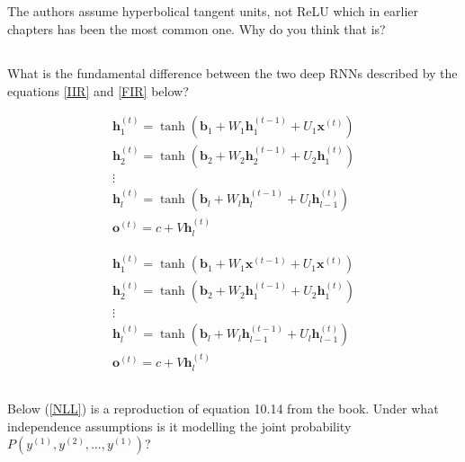 \documentclass[a4paper]{report}
\renewcommand{\vec}[1]{{\boldsymbol{#1}}}
\newcommand{\tvec}[2]{{\vec{#1}^{(#2)}}}
\newcommand{\stvec}[3]{{\vec{#1}_{#2}^{(#3)}}}
\begin{document}
\subsection{} The authors assume hyperbolical tangent units, not ReLU which in earlier chapters has been the most common one. Why do you think that is?

\subsection{} What is the fundamental difference between the two deep RNNs described by the equations \ref{IIR} and \ref{FIR} below?

  \begin{equation}
    \label{IIR}
\begin{gathered}
  \stvec{h}{1}{t} = \tanh(\vec{b}_1 + W_1 \stvec{h}{1}{t-1} + U_1\tvec{x}{t})\\
  \stvec{h}{2}{t} = \tanh(\vec{b}_2 + W_2 \stvec{h}{2}{t-1} + U_2\stvec{h}{1}{t})\\
  \vdots \\
    \stvec{h}{l}{t} = \tanh(\vec{b}_l + W_l \stvec{h}{l}{t-1} + U_l\stvec{h}{l-1}{t})\\
    \tvec{o}{t} = c + V\stvec{h}{l}{t}
\end{gathered}
\end{equation}

  \vspace{10mm}

  \begin{equation}
    \label{FIR}
\begin{gathered}
  \stvec{h}{1}{t} = \tanh(\vec{b}_1 + W_1 \tvec{x}{t-1} + U_1\tvec{x}{t})\\
  \stvec{h}{2}{t} = \tanh(\vec{b}_2 + W_2 \stvec{h}{1}{t-1} + U_2\stvec{h}{1}{t})\\
  \vdots \\
    \stvec{h}{l}{t} = \tanh(\vec{b}_l + W_l \stvec{h}{l-1}{t-1} + U_l\stvec{h}{l-1}{t})\\
    \tvec{o}{t} = c + V\stvec{h}{l}{t}
\end{gathered}
\end{equation}

  \subsection{} Below (\ref{NLL}) is a reproduction of equation 10.14 from the book. Under what independence assumptions is it modelling the joint probability $P(y^{(1)}, y^{(2)}, \ldots, y^{(1)})$?
\end{document}
